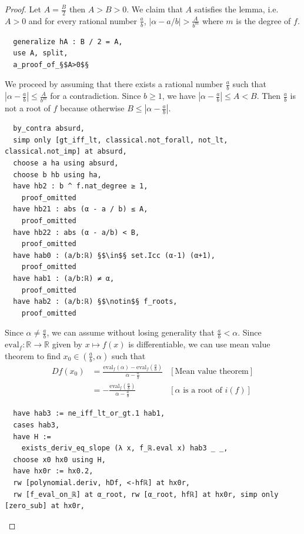 \documentclass{report}
\theoremstyle{definition}
\begin{document}
\begin{proof}
Let $A=\frac B 2$ then $A > B > 0$. We claim that $A$ satisfies the lemma, i.e. $A>0$ and for every rational number $\frac ab$, $\left|\alpha-a/b\right|>\frac A{b^m}$ where $m$ is the degree of $f$.

\begin{verbatim}
  generalize hA : B / 2 = A,
  use A, split,
  a_proof_of_§$A>0$§
\end{verbatim}

We proceed by assuming that there exists a rational number $\frac a b$ such that $\left|\alpha-\frac a b\right|\le\frac A{b^m}$ for a contradiction. Since $b\ge 1$, we have $\left|\alpha-\frac ab\right|\le A < B$. Then $\frac a b$ is not a root of $f$ because otherwise $B\le \left|\alpha-\frac ab\right|$.

\begin{verbatim}
  by_contra absurd, 
  simp only [gt_iff_lt, classical.not_forall, not_lt, classical.not_imp] at absurd,
  choose a ha using absurd,
  choose b hb using ha,                               
  have hb2 : b ^ f.nat_degree ≥ 1,
    proof_omitted
  have hb21 : abs (α - a / b) ≤ A, 
    proof_omitted
  have hb22 : abs (α - a/b) < B,
    proof_omitted
  have hab0 : (a/b:ℝ) §$\in$§ set.Icc (α-1) (α+1),
    proof_omitted
  have hab1 : (a/b:ℝ) ≠ α,
    proof_omitted
  have hab2 : (a/b:ℝ) §$\notin$§ f_roots,
    proof_omitted
\end{verbatim}

Since $\alpha\ne \frac a b$, we can assume without losing generality that $\frac a b < \alpha$. Since $\mathrm{eval}_f:\mathbb R\to \mathbb R$ given by $x\mapsto f(x)$ is differentiable, we can use mean value theorem to find $x_0\in\left(\frac ab, \alpha\right)$ such that 
\begin{equation*}
\begin{aligned}
  Df(x_0)&=\frac{\mathrm{eval}_f(\alpha)-\mathrm{eval}_f(\frac ab)}{\alpha-\frac ab} & [\text{Mean value theorem}]\\
         &=-\frac{\mathrm{eval}_f(\frac ab)}{\alpha-\frac ab} & [\alpha\text{ is a root of } i(f)]
\end{aligned}
\end{equation*}

\begin{verbatim}
  have hab3 := ne_iff_lt_or_gt.1 hab1,
  cases hab3,
  have H := 
    exists_deriv_eq_slope (λ x, f_ℝ.eval x) hab3 _ _, 
  choose x0 hx0 using H,
  have hx0r := hx0.2,
  rw [polynomial.deriv, hDf, <-hfℝ] at hx0r,
  rw [f_eval_on_ℝ] at α_root, rw [α_root, hfℝ] at hx0r, simp only [zero_sub] at hx0r,
\end{verbatim}


\end{proof}
\end{document}
